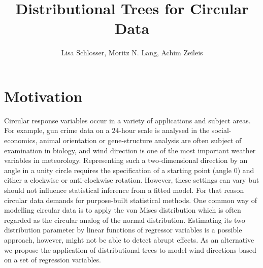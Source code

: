 \documentclass[twoside]{report}
\begin{document}

\title{Distributional Trees for Circular Data}

\author{Lisa Schlosser, Moritz N. Lang, Achim Zeileis}





\maketitle



\section{Motivation}
Circular response variables occur in a variety of applications and subject areas. 
For example, gun crime data on a $24$-hour scale is analysed in the social-economics, 
animal orientation or gene-structure analysis are often subject of examination in biology, 
and wind direction is one of the most important weather variables in meteorology.
Representing such a two-dimensional direction by an angle in a unity circle requires 
the specification of a starting point (angle 0) and either a clockwise or anti-clockwise 
rotation. However, these settings can vary but should not influence statistical 
inference from a fitted model.
For that reason circular data demands for purpose-built statistical methods. 
One common way of modelling circular data is to apply the von Mises distribution 
which is often regarded as the circular analog of the normal distribution. 
Estimating its two distribution parameter by linear functions of regressor variables 
is a possible approach, however, might not be able to detect abrupt effects.
As an alternative  we propose the application of distributional trees to
model wind directions based on a set of regression variables.
\end{document}
